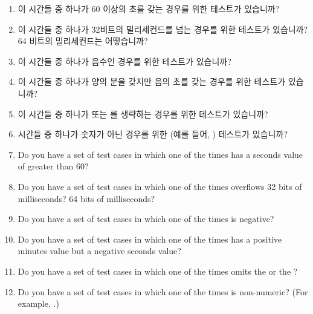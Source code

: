 {\begin{enumerate}

	\item	이 시간들 중 하나가 60 이상의 초를 갖는 경우를 위한 테스트가
		있습니까?
	\item	이 시간들 중 하나가 32비트의 밀리세컨드를 넘는 경우를 위한
		테스트가 있습니까?  64 비트의 밀리세컨드는 어떻습니까?
	\item	이 시간들 중 하나가 음수인 경우를 위한 테스트가 있습니까?
	\item	이 시간들 중 하나가 양의 분을 갖지만 음의 초를 갖는 경우를 위한
		테스트가 있습니까?
	\item	이 시간들 중 하나가  또는  를 생략하는 경우를 위한
		테스트가 있습니까?
	\item	시간들 중 하나가 숫자가 아닌 경우를 위한 (예를 들어,
		) 테스트가 있습니까?

	\iffalse

	\item	Do you have a set of test cases in which one of the
		times has a seconds value of greater than 60?
	\item	Do you have a set of test cases in which one of the
		times overflows 32 bits of milliseconds?  64 bits of
		milliseconds?
	\item	Do you have a set of test cases in which one of the
		times is negative?
	\item	Do you have a set of test cases in which one of the
		times has a positive minutes value but a negative
		seconds value?
	\item	Do you have a set of test cases in which one of the
		times omits the  or the ?
	\item	Do you have a set of test cases in which one of the
		times is non-numeric?  (For example, .)


\end{enumerate}}
